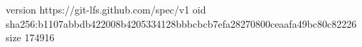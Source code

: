 version https://git-lfs.github.com/spec/v1
oid sha256:b1107abbdb422008b4205334128bbbcbcb7efa28270800ceaafa49bc80c82226
size 174916
